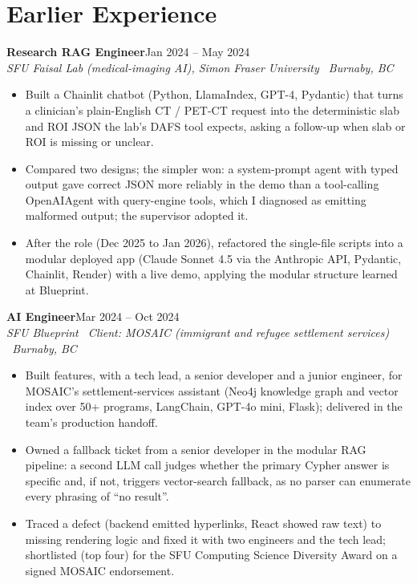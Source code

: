 \documentclass[letterpaper,10pt]{article}
\newcommand{\role}[3]{\vspace{1pt}\textbf{#1}\hfill #2\\[1pt]\textit{#3}\\[1pt]}
\begin{document}
\section{Earlier Experience}
\role{Research RAG Engineer}{Jan 2024 -- May 2024}{SFU Faisal Lab (medical-imaging AI), Simon Fraser University \textbar\  Burnaby, BC}
\begin{itemize}
  \item Built a Chainlit chatbot (Python, LlamaIndex, GPT-4, Pydantic) that turns a clinician's plain-English CT / PET-CT request into the deterministic slab and ROI JSON the lab's DAFS tool expects, asking a follow-up when slab or ROI is missing or unclear.
  \item Compared two designs; the simpler won: a system-prompt agent with typed output gave correct JSON more reliably in the demo than a tool-calling OpenAIAgent with query-engine tools, which I diagnosed as emitting malformed output; the supervisor adopted it.
  \item After the role (Dec 2025 to Jan 2026), refactored the single-file scripts into a modular deployed app (Claude Sonnet 4.5 via the Anthropic API, Pydantic, Chainlit, Render) with a live demo, applying the modular structure learned at Blueprint.
\end{itemize}
\vspace{2pt}
\role{AI Engineer}{Mar 2024 -- Oct 2024}{SFU Blueprint \textbar\  Client: MOSAIC (immigrant and refugee settlement services) \textbar\  Burnaby, BC}
\begin{itemize}
  \item Built features, with a tech lead, a senior developer and a junior engineer, for MOSAIC's settlement-services assistant (Neo4j knowledge graph and vector index over 50+ programs, LangChain, GPT-4o mini, Flask); delivered in the team's production handoff.
  \item Owned a fallback ticket from a senior developer in the modular RAG pipeline: a second LLM call judges whether the primary Cypher answer is specific and, if not, triggers vector-search fallback, as no parser can enumerate every phrasing of ``no result''.
  \item Traced a defect (backend emitted hyperlinks, React showed raw text) to missing rendering logic and fixed it with two engineers and the tech lead; shortlisted (top four) for the SFU Computing Science Diversity Award on a signed MOSAIC endorsement.
\end{itemize}
\vspace{2pt}
\end{document}
